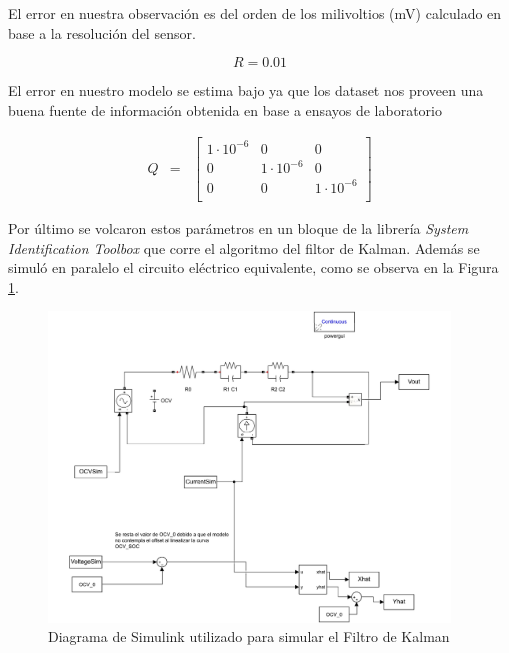 \documentclass[10pt,a4paper]{article}
\begin{document}
\noindent El error en nuestra observación es del orden de los milivoltios
(mV) calculado en base a la resolución del sensor.

\begin{equation}
    R = 0.01  \nonumber
\end{equation}

\noindent El error en nuestro modelo se estima bajo ya que los dataset nos 
proveen una buena fuente de información obtenida en base a ensayos de 
laboratorio

\begin{equation}
    \begin{array}{llll}
	Q & = & \begin{bmatrix}
	    1\cdot10^{-6} & 0 & 0 \\
	    0 & 1\cdot10^{-6} & 0 \\
	    0 & 0 & 1\cdot10^{-6} \\
	\end{bmatrix} 
    \end{array} \nonumber
\end{equation}

Por último se volcaron estos parámetros en un bloque de la librería \emph{System
Identification Toolbox} que corre el algoritmo del filtor de Kalman. Además se
simuló en paralelo el circuito eléctrico equivalente, como se observa en la
Figura \ref{simulink_diagram}.

\begin{figure}[h!]
    \begin{center}
	\includegraphics[width=0.95\textwidth]{simulink.pdf}
	\caption{Diagrama de Simulink utilizado para simular el Filtro de Kalman}
	\label{simulink_diagram}
    \end{center}
\end{figure}
\end{document}
